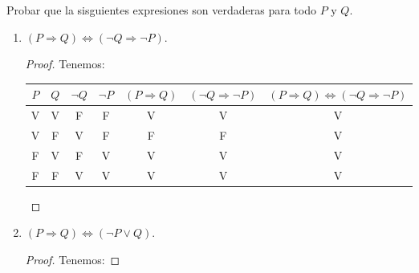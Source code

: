 	\begin{problema}[Problema 4]
		Probar que la sisguientes expresiones son verdaderas para todo $P$ y $Q$.
		\begin{enumerate}
			\item $(P \Rightarrow Q) \Leftrightarrow(\neg Q \Rightarrow \neg P)$.
			\begin{proof}
				Tenemos: 
				
				\begin{table}[H]
					\centering
					\begin{tabular}{|c|c|c|c|c|c|c|}
						\hline
						$P$ & $Q$ & $\neg Q$ & $\neg P$ & $(P \Rightarrow Q)$ & $(\neg Q \Rightarrow \neg P)$ & $(P \Rightarrow Q) \Leftrightarrow(\neg Q \Rightarrow \neg P)$ \\ \hline
						V   & V   & F        & F        & V                                & V                                                                        & V                                                              \\ \hline
						V   & F   & V        & F        & F                                & F                                                                        & V                                                              \\ \hline
						F   & V   & F        & V        & V                                & V                                                                        & V                                                              \\ \hline
						F   & F   & V        & V        & V                                & V                                                                        & V                                                              \\ \hline
					\end{tabular}
				\end{table}
				
			\end{proof}
			\item $(P \Rightarrow Q) \Leftrightarrow(\neg P \vee Q)$.
			\begin{proof}
				Tenemos: 
				

\end{proof}
\end{enumerate}
\end{problema}
